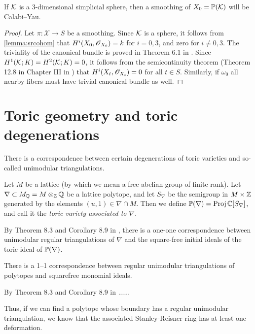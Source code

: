 \begin{lemma}
If $\K$ is a 3-dimensional simplicial sphere, then a smoothing of $X_0=\P(\K)$ will be Calabi--Yau.
\end{lemma}
\begin{proof}
Let $\pi:\mathscr X \to S$ be a smoothing. Since $\K$ is a sphere, it follows from \ref{lemma:srcohom} that $H^i(X_0,\OO_{X_0})=k$ for $i=0,3$, and zero for $i \neq 0,3$. The triviality of the canonical bundle is proved in Theorem 6.1 in \cite{eisenbud_graphcurves}. Since $H^1(\K;K)=H^2(\K;K)=0$, it follows from the semicontinuity theorem (Theorem 12.8 in Chapter III in \cite{hartshorne}) that $H^i(X_t,\OO_{X_t})=0$ for all $t \in S$. Similarly, if $\omega_0$ all nearby fibers must have trivial canonical bundle as well.
\end{proof}

\section{Toric geometry and toric degenerations}

There is a correspondence between certain degenerations of toric varieties and so-called unimodular triangulations. 

Let $M$ be a lattice (by which we mean a free abelian group of finite rank). Let $\nabla \subset M_\Q = M \otimes_\Z \Q$ be a lattice polytope, and let $S_\nabla$ be the semigroup in $M \times \Z$ generated by the elements $(u,1) \in \nabla \cap M$. Then we define $\P(\nabla)=\Proj \C[S_\nabla]$, and call it the \emph{toric variety associated to $\nabla$}. 

By Theorem 8.3 and Corollary 8.9 in \cite{sturmfels}, there is a one-one correspondence between unimodular regular triangulations of $\nabla$ and the square-free initial ideals of the toric ideal of $\P(\nabla)$. 

\begin{proposition}
\label{eq:unimodular_triangs}
There is a 1--1 correspondence between regular unimodular triangulations of polytopes and squarefree monomial ideals.
\end{proposition}

By Theorem 8.3 and Corollary 8.9 in \cite{sturmfels}......

Thus, if we can find a polytope whose boundary has a regular unimodular triangulation, we know that the associated Stanley-Reisner ring has at least one deformation. 